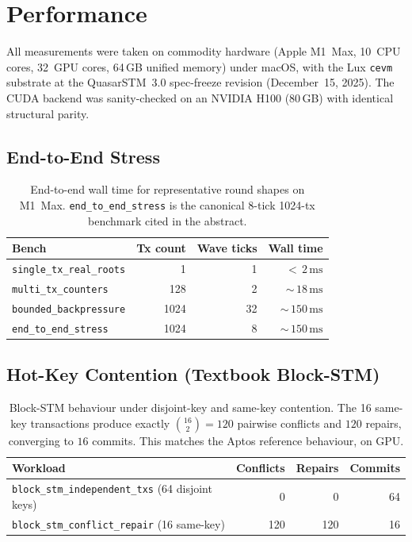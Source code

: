 \section{Performance}

\label{sec:performance}

All measurements were taken on commodity hardware (Apple M1~Max,
10~CPU cores, 32~GPU cores, 64\,GB unified memory) under macOS,
with the Lux \texttt{cevm} substrate at the QuasarSTM~3.0 spec-freeze
revision (December~15, 2025). The CUDA backend was sanity-checked
on an NVIDIA H100 (80\,GB) with identical structural parity.

\subsection{End-to-End Stress}

\begin{table}[ht]
\centering
\begin{tabular}{@{}lrrr@{}}
\toprule
\textbf{Bench} & \textbf{Tx count} &
\textbf{Wave ticks} & \textbf{Wall time} \\
\midrule
\texttt{single\_tx\_real\_roots}     & 1     & 1   & ${<}\,2\,\text{ms}$ \\
\texttt{multi\_tx\_counters}         & 128   & 2   & ${\sim}\,18\,\text{ms}$ \\
\texttt{bounded\_backpressure}       & 1024  & 32  & ${\sim}\,150\,\text{ms}$ \\
\texttt{end\_to\_end\_stress}        & 1024  & 8   & ${\sim}\,150\,\text{ms}$ \\
\bottomrule
\end{tabular}
\caption{End-to-end wall time for representative round shapes on
M1~Max. \texttt{end\_to\_end\_stress} is the canonical 8-tick
1024-tx benchmark cited in the abstract.}
\label{tab:end-to-end}
\end{table}

\subsection{Hot-Key Contention (Textbook Block-STM)}

\begin{table}[ht]
\centering
\begin{tabular}{@{}lrrr@{}}
\toprule
\textbf{Workload} & \textbf{Conflicts} &
\textbf{Repairs} & \textbf{Commits} \\
\midrule
\texttt{block\_stm\_independent\_txs} (64 disjoint keys) & 0   & 0   & 64 \\
\texttt{block\_stm\_conflict\_repair} (16 same-key)      & 120 & 120 & 16 \\
\bottomrule
\end{tabular}
\caption{Block-STM behaviour under disjoint-key and same-key
contention. The 16 same-key transactions produce exactly
$\binom{16}{2} = 120$ pairwise conflicts and $120$ repairs,
converging to $16$ commits. This matches the Aptos
\cite{gelashvili2022blockstm} reference behaviour, on GPU.}
\label{tab:hot-key}
\end{table}


